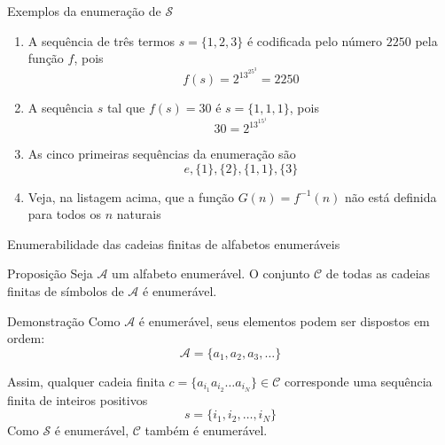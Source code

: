 \begin{frame}[fragile]{Exemplos da enumeração de $\mathcal{S}$}

    \begin{enumerate}
        \item A sequência de três termos $s = \lbrace 1, 2, 3\rbrace$ é codificada pelo número
        $2250$ pela função $f$, pois
        \[
            f(s) = 2^13^25^3 = 2250
        \]

        \item A sequência $s$ tal que $f(s) = 30$ é $s = \lbrace 1, 1, 1\rbrace$, pois
        \[
            30 = 2^13^15^1
        \]

        \item As cinco primeiras sequências da enumeração são
        \[
            e, \lbrace 1\rbrace, \lbrace 2\rbrace, \lbrace 1, 1\rbrace, \lbrace 3\rbrace
        \]

        \item Veja, na listagem acima, que a função $G(n) = f^{-1}(n)$ não está definida para
            todos os $n$ naturais
    \end{enumerate}

\end{frame}

\begin{frame}[fragile]{Enumerabilidade das cadeias finitas de alfabetos enumeráveis}

    \begin{block}{Proposição}
        Seja $\mathcal{A}$ um alfabeto enumerável. O conjunto $\mathcal{C}$ de todas as cadeias 
        finitas de símbolos de $\mathcal{A}$ é enumerável.
    \end{block}

    \begin{block}{Demonstração}
        Como $\mathcal{A}$ é enumerável, seus elementos podem ser dispostos em ordem:
        \[
            \mathcal{A} = \lbrace a_1, a_2, a_3, \ldots\rbrace
        \]

        Assim, qualquer cadeia finita $c = \lbrace a_{i_1}a_{i_2}\ldots a_{i_N}\rbrace\in\mathcal{C}$ 
        corresponde uma sequência finita de inteiros positivos
        \[
            s = \lbrace i_1, i_2, \ldots, i_N\rbrace
        \]
        Como $\mathcal{S}$ é enumerável, $\mathcal{C}$ também é enumerável.
    \end{block}


\end{frame}
